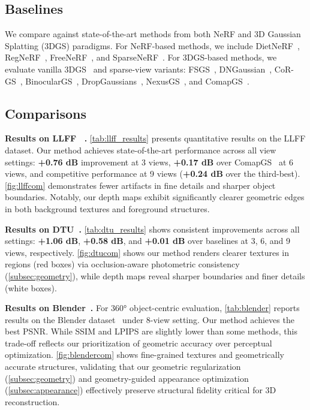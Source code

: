 \subsection{Baselines}
We compare against state-of-the-art methods from both NeRF and 3D Gaussian 
Splatting (3DGS) paradigms.
For NeRF-based methods, we include DietNeRF~\cite{jain2021dietnerf}, 
RegNeRF~\cite{niemeyer2022regnerf}, FreeNeRF~\cite{yang2023freenerf}, 
and SparseNeRF~\cite{wang2023sparsenerf}.
For 3DGS-based methods, we evaluate vanilla 3DGS~\cite{kerbl20233d} and 
sparse-view variants: FSGS~\cite{zhu2024fsgs}, DNGaussian~\cite{li2024dngaussian}, 
CoR-GS~\cite{zhang2024cor}, BinocularGS~\cite{han2024binocular}, 
DropGaussians~\cite{park2025dropgaussian}, NexusGS~\cite{zheng2025nexusgs}, 
and ComapGS~\cite{jang2025comapgs}.

\subsection{Comparisons}
\noindent \textbf{Results on LLFF~\cite{mildenhall2019local} .}
\cref{tab:llff_results} presents quantitative results on the LLFF dataset. 
Our method achieves state-of-the-art performance across all view settings: 
\textbf{+0.76 dB} improvement at 3 views, \textbf{+0.17 dB} over 
ComapGS~\cite{jang2025comapgs} at 6 views, and competitive performance 
at 9 views (\textbf{+0.24 dB} over the third-best). \cref{fig:llffcom} 
demonstrates fewer artifacts in fine details and sharper object boundaries. 
Notably, our depth maps exhibit significantly clearer geometric edges in 
both background textures and foreground structures.

\noindent \textbf{Results on DTU~\cite{jensen2014large}.} 
\cref{tab:dtu_results} shows consistent improvements across all settings: 
\textbf{+1.06 dB}, \textbf{+0.58 dB}, and \textbf{+0.01 dB} over baselines 
at 3, 6, and 9 views, respectively. \cref{fig:dtucom} shows our method 
renders clearer textures in regions (red boxes) via occlusion-aware 
photometric consistency (\cref{subsec:geometry}), while depth maps reveal 
sharper boundaries and finer details (white boxes).


\noindent \textbf{Results on Blender~\cite{mildenhall2021nerf}.} 
For 360° object-centric evaluation, \cref{tab:blender} reports results 
on the Blender dataset~\cite{mildenhall2021nerf} under 8-view setting. 
Our method achieves the best PSNR. While SSIM and LPIPS are slightly lower 
than some methods, this trade-off reflects our prioritization of geometric 
accuracy over perceptual optimization. \cref{fig:blendercom} shows 
fine-grained textures and geometrically accurate structures, 
validating that our geometric regularization (\cref{subsec:geometry}) 
and geometry-guided appearance optimization (\cref{subsec:appearance}) 
effectively preserve structural fidelity critical for 3D reconstruction.






